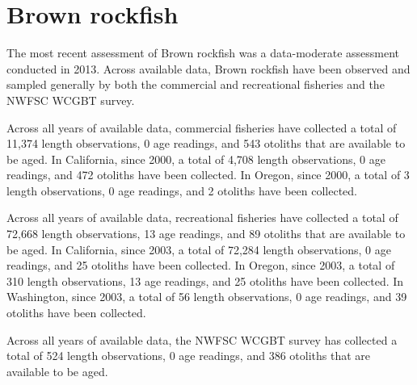 \documentclass[11pt,
  english,
  letterpaper,
]{article}
\begin{document}

\hypertarget{brown-rockfish}{%
\section{Brown rockfish}\label{brown-rockfish}}

\leavevmode\tagmcend\tagstructend


The most recent assessment of Brown rockfish was a data-moderate assessment conducted in 2013. Across available data, Brown rockfish have been observed and sampled generally by both the commercial and recreational fisheries and the NWFSC WCGBT survey.

\leavevmode\tagmcend\tagstructend\par


Across all years of available data, commercial fisheries have collected a total of 11,374 length observations, 0 age readings, and 543 otoliths that are available to be aged. In California, since 2000, a total of 4,708 length observations, 0 age readings, and 472 otoliths have been collected. In Oregon, since 2000, a total of 3 length observations, 0 age readings, and 2 otoliths have been collected.

\leavevmode\tagmcend\tagstructend\par


Across all years of available data, recreational fisheries have collected a total of 72,668 length observations, 13 age readings, and 89 otoliths that are available to be aged. In California, since 2003, a total of 72,284 length observations, 0 age readings, and 25 otoliths have been collected. In Oregon, since 2003, a total of 310 length observations, 13 age readings, and 25 otoliths have been collected. In Washington, since 2003, a total of 56 length observations, 0 age readings, and 39 otoliths have been collected.

\leavevmode\tagmcend\tagstructend\par


Across all years of available data, the NWFSC WCGBT survey has collected a total of 524 length observations, 0 age readings, and 386 otoliths that are available to be aged.
\end{document}
